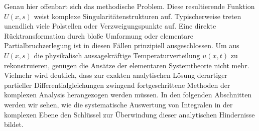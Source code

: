Genau hier offenbart sich das methodische Problem. Diese resultierende Funktion $U(x,s)$ weist komplexe Singularitätenstrukturen auf. Typischerweise treten unendlich viele Polstellen oder Verzweigungspunkte auf. Eine direkte Rücktransformation durch bloße Umformung oder elementare Partialbruchzerlegung ist in diesen Fällen prinzipiell ausgeschlossen. Um aus $U(x,s)$ die physikalisch aussagekräftige Temperaturverteilung $u(x,t)$ zu rekonstruieren, genügen die Ansätze der elementaren Systemtheorie nicht mehr. Vielmehr wird deutlich, dass zur exakten analytischen Lösung derartiger partieller Differentialgleichungen zwingend fortgeschrittene Methoden der komplexen Analysis herangezogen werden müssen. In den folgenden Abschnitten werden wir sehen, wie die systematische Auswertung von Integralen in der komplexen Ebene den Schlüssel zur Überwindung dieser analytischen Hindernisse bildet.